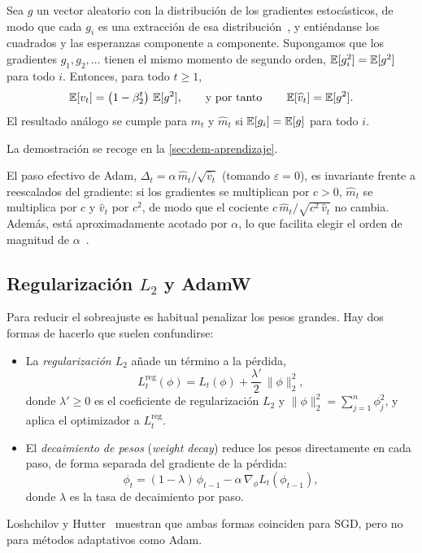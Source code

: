 \begin{proposicion}\label{prop:adam-sesgo}
Sea $g$ un vector aleatorio con la distribución de los gradientes estocásticos,
de modo que cada $g_i$ es una extracción de esa distribución~\cite[sec.~3]{kingma2014},
y entiéndanse los cuadrados y las esperanzas componente a componente.
Supongamos que los gradientes $g_1, g_2, \dots$ tienen el mismo momento de
segundo orden, $\operatorname{\mathbb{E}}[g_i^2] = \operatorname{\mathbb{E}}[g^2]$ para todo $i$. Entonces, para todo $t \ge 1$,
\[
  \operatorname{\mathbb{E}}[v_t] = \bigl(1 - \beta_2^{t}\bigr)\, \operatorname{\mathbb{E}}[g^2],
  \qquad\text{y por tanto}\qquad
  \operatorname{\mathbb{E}}[\widehat{v}_t] = \operatorname{\mathbb{E}}[g^2].
\]
El resultado análogo se cumple para $m_t$ y $\widehat{m}_t$ si
$\operatorname{\mathbb{E}}[g_i] = \operatorname{\mathbb{E}}[g]$ para todo $i$.
\end{proposicion}
La demostración se recoge en la \cref{sec:dem-aprendizaje}.

El paso efectivo de Adam,
$\Delta_t = \alpha\, \widehat{m}_t / \sqrt{\widehat{v}_t}$ (tomando
$\varepsilon = 0$), es invariante frente a reescalados del gradiente: si los
gradientes se multiplican por $c > 0$, $\widehat{m}_t$ se multiplica por $c$ y
$\widehat{v}_t$ por $c^2$, de modo que el cociente
$c\,\widehat{m}_t / \sqrt{c^2\, \widehat{v}_t}$ no cambia. Además, está
aproximadamente acotado por $\alpha$, lo que facilita elegir el orden de magnitud
de $\alpha$~\cite[sec.~2.1]{kingma2014}.

\subsection{Regularización \texorpdfstring{$L_2$}{L2} y AdamW}\label{sec:l2-wd}

Para reducir el sobreajuste es habitual penalizar los pesos grandes. Hay dos
formas de hacerlo que suelen confundirse:
\begin{itemize}
  \item La \emph{regularización $L_2$} añade un término a la pérdida,
  \[
    L_t^{\mathrm{reg}}(\phi) = L_t(\phi) + \frac{\lambda'}{2}\, \|\phi\|_2^2 ,
  \]
  donde $\lambda' \ge 0$ es el coeficiente de regularización $L_2$ y
  $\|\phi\|_2^2 = \sum_{j=1}^{n} \phi_j^2$, y aplica el optimizador a
  $L_t^{\mathrm{reg}}$.
  \item El \emph{decaimiento de pesos} (\emph{weight decay}) reduce los pesos
  directamente en cada paso, de forma separada del gradiente de la pérdida:
  \[
    \phi_{t} = (1 - \lambda)\, \phi_{t-1} - \alpha\, \nabla_\phi L_t(\phi_{t-1}),
  \]
  donde $\lambda$ es la tasa de decaimiento por paso.
\end{itemize}
Loshchilov y Hutter~\cite{loshchilov2019} muestran que ambas formas coinciden
para SGD, pero no para métodos adaptativos como Adam.


